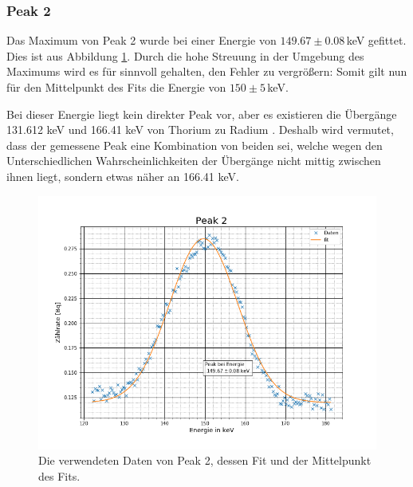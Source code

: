 \subsubsection{Peak 2}
Das Maximum von Peak 2 wurde bei einer Energie von $149.67\pm0.08\,$keV gefittet. Dies ist aus Abbildung \ref{p2}. Durch die hohe Streuung in der Umgebung des Maximums wird es für sinnvoll gehalten, den Fehler zu vergrößern: Somit gilt nun für den Mittelpunkt des Fits die Energie von $150\pm5\,$keV.\par
Bei dieser Energie liegt kein direkter Peak vor, aber es existieren die Übergänge 131.612 keV  und 166.41 keV  von Thorium zu Radium \cite{Thorium} . Deshalb wird vermutet, dass der gemessene Peak eine Kombination von beiden sei, welche wegen den Unterschiedlichen Wahrscheinlichkeiten der Übergänge nicht mittig zwischen ihnen liegt, sondern etwas näher an 166.41 keV.
\begin{figure}[h]
	\centering
	\includegraphics[scale=0.7]{Bilder/Anhang/P2}
	\caption[Thorium Peak 2]{\small Die verwendeten Daten von Peak 2, dessen Fit und der Mittelpunkt des Fits.}
	\label{p2}
\end{figure}
\FloatBarrier
